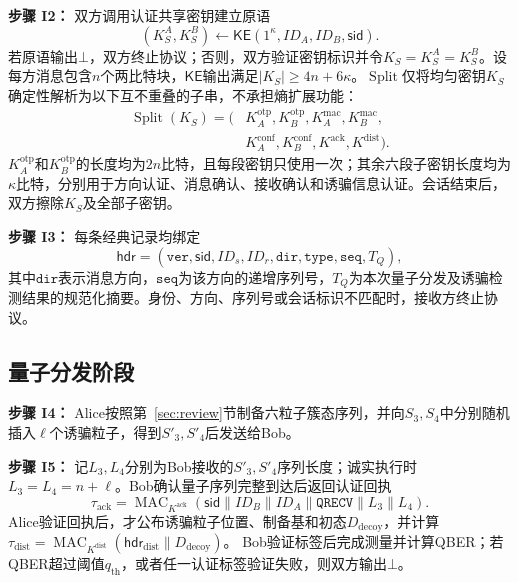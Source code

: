 \documentclass[UTF8,10pt,a4paper]{ctexart}
\theoremstyle{aqdplain}
\newcommand{\sid}{\mathsf{sid}}
\newcommand{\concat}{\mathbin{\|}}
\newcommand{\abort}{\bot}
\begin{document}
\textbf{步骤 I2：} 双方调用认证共享密钥建立原语
\begin{equation}
(K_S^A,K_S^B)\leftarrow
\mathsf{KE}(1^\kappa,ID_A,ID_B,\sid).
\label{eq:ke}
\end{equation}
若原语输出$\abort$，双方终止协议；否则，双方验证密钥标识并令$K_S=K_S^A=K_S^B$。设每方消息包含$n$个两比特块，$\mathsf{KE}$输出满足$|K_S|\geq 4n+6\kappa$。$\operatorname{Split}$仅将均匀密钥$K_S$确定性解析为以下互不重叠的子串，不承担熵扩展功能：
\begin{equation}
\begin{aligned}
\operatorname{Split}(K_S)=(&K_A^{\mathrm{otp}},K_B^{\mathrm{otp}},
K_A^{\mathrm{mac}},K_B^{\mathrm{mac}},\\
&K_A^{\mathrm{conf}},K_B^{\mathrm{conf}},
K^{\mathrm{ack}},K^{\mathrm{dist}}).
\end{aligned}
\label{eq:keys}
\end{equation}
$K_A^{\mathrm{otp}}$和$K_B^{\mathrm{otp}}$的长度均为$2n$比特，且每段密钥只使用一次；其余六段子密钥长度均为$\kappa$比特，分别用于方向认证、消息确认、接收确认和诱骗信息认证。会话结束后，双方擦除$K_S$及全部子密钥。

\textbf{步骤 I3：} 每条经典记录均绑定
\begin{equation}
\mathsf{hdr}=(\mathtt{ver},\sid,ID_s,ID_r,
\mathtt{dir},\mathtt{type},\mathtt{seq},T_Q),
\label{eq:canonical-header}
\end{equation}
其中$\mathtt{dir}$表示消息方向，$\mathtt{seq}$为该方向的递增序列号，$T_Q$为本次量子分发及诱骗检测结果的规范化摘要。身份、方向、序列号或会话标识不匹配时，接收方终止协议。

\subsection{量子分发阶段}

\textbf{步骤 I4：} Alice按照第~\ref{sec:review}节制备六粒子簇态序列，并向$S_3,S_4$中分别随机插入$\ell$个诱骗粒子，得到$S'_3,S'_4$后发送给Bob。

\textbf{步骤 I5：} 记$L_3,L_4$分别为Bob接收的$S'_3,S'_4$序列长度；诚实执行时$L_3=L_4=n+\ell$。Bob确认量子序列完整到达后返回认证回执
\begin{equation}
\tau_{\mathrm{ack}}=\operatorname{MAC}_{K^{\mathrm{ack}}}
(\sid\concat ID_B\concat ID_A\concat\mathtt{QRECV}
\concat L_3\concat L_4).
\label{eq:ack}
\end{equation}
Alice验证回执后，才公布诱骗粒子位置、制备基和初态$D_{\mathrm{decoy}}$，并计算
$\tau_{\mathrm{dist}}=\operatorname{MAC}_{K^{\mathrm{dist}}}
(\mathsf{hdr}_{\mathrm{dist}}\concat D_{\mathrm{decoy}})$。
Bob验证标签后完成测量并计算QBER；若QBER超过阈值$q_{\mathrm{th}}$，或者任一认证标签验证失败，则双方输出$\abort$。
\end{document}
